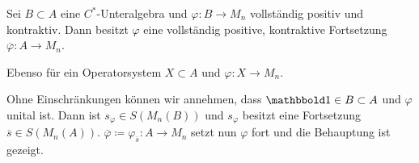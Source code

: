 \begin{satz}[label=satz:326]
	Sei $B \subset A $ eine $C^*$-Unteralgebra und $\varphi \colon B \to M_n$ vollständig positiv und kontraktiv.
	Dann besitzt $\varphi$ eine vollständig positive, kontraktive Fortsetzung $\overline{\varphi} \colon A \to M_n$.
	
	Ebenso für ein Operatorsystem $X \subset A$ und $\varphi \colon X \to M_n$.
\end{satz}
\begin{beweis}
	Ohne Einschränkungen können wir annehmen, dass $\ind \in B \subset A$ und $\varphi$ unital ist.
	Dann ist $s_\varphi \in S(M_n(B))$ und $s_\varphi$ besitzt eine Fortsetzung $\overline{s} \in S(M_n(A))$.
	$\overline{\varphi} \coloneqq \varphi_{\overline{s}} \colon A \to M_n$ setzt nun $\varphi$ fort und die Behauptung ist gezeigt.
\end{beweis}

